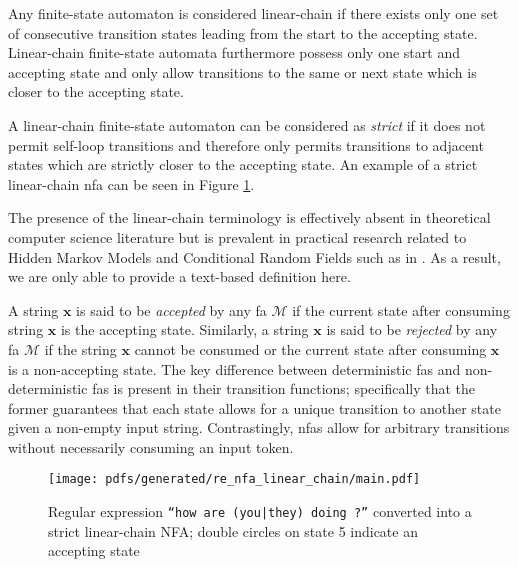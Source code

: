 \begin{definition}
  \label{def:lfa}
  Any finite-state automaton is considered linear-chain if there exists only one
  set of consecutive transition states leading from the start to the accepting
  state. Linear-chain finite-state automata furthermore possess only one start
  and accepting state and only allow transitions to the same or next state which is
  closer to the accepting state.

  \begin{remark}
    \label{rmk:strict_linear_chain}
    A linear-chain finite-state automaton can be considered as \textit{strict}
    if it does not permit self-loop transitions and therefore only permits
    transitions to adjacent states which are strictly closer to the
    accepting state. An example of a strict linear-chain \ac{nfa} can be seen in
    Figure \ref{fig:regex_fa}.
  \end{remark}

  \begin{remark}
    The presence of the linear-chain terminology is effectively absent in
    theoretical computer science literature but is prevalent in practical
    research related to Hidden Markov Models and Conditional Random
    Fields such as in \citet{tsuruoka2009fast}. As a result, we are only
    able to provide a text-based definition here.
  \end{remark}
  
\end{definition}

A string $\bm{x}$ is said to be \textit{accepted} by any \ac{fa} $\mathcal{M}$ if the
current state after consuming string $\bm{x}$ is the accepting state. Similarly,
a string $\bm{x}$ is said to be \textit{rejected} by any \ac{fa} $\mathcal{M}$ if the
string $\bm{x}$ cannot be consumed or the current state after consuming $\bm{x}$
is a non-accepting state. The key difference between deterministic \ac{fas} and
non-deterministic \ac{fas} is present in
their transition functions; specifically that the former guarantees that each
state allows for a unique transition to another state given a non-empty input
string. Contrastingly, \ac{nfas} allow for arbitrary transitions without necessarily
consuming an input token.

\begin{figure}[t]
  \centering
  \texttt{[image: pdfs/generated/re\_nfa\_linear\_chain/main.pdf]}
  \caption{Regular expression \texttt{``how are (you|they) doing ?''} converted
    into a strict linear-chain NFA; double circles on state 5 indicate an
    accepting state}
  \label{fig:regex_fa}
\end{figure}

